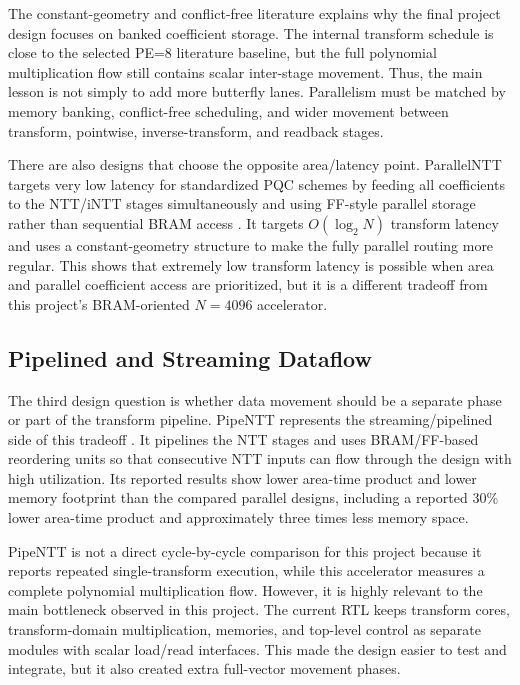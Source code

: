 \documentclass[a4paper, 12pt, titlepage]{article}
\begin{document}
The constant-geometry and conflict-free literature explains why the final
project design focuses on banked coefficient storage. The internal transform
schedule is close to the selected PE=8 literature baseline, but the full
polynomial multiplication flow still contains scalar inter-stage movement.
Thus, the main lesson is not simply to add more butterfly lanes. Parallelism
must be matched by memory banking, conflict-free scheduling, and wider movement
between transform, pointwise, inverse-transform, and readback stages.

There are also designs that choose the opposite area/latency point. ParallelNTT
targets very low latency for standardized PQC schemes by feeding all
coefficients to the NTT/iNTT stages simultaneously and using FF-style parallel
storage rather than sequential BRAM access \cite{parallelntt}. It targets
\(O(\log_2 N)\) transform latency and uses a constant-geometry structure to make
the fully parallel routing more regular. This shows that extremely low
transform latency is possible when area and parallel coefficient access are
prioritized, but it is a different tradeoff from this project's BRAM-oriented
\(N=4096\) accelerator.

\subsection{Pipelined and Streaming Dataflow}

The third design question is whether data movement should be a separate phase
or part of the transform pipeline. PipeNTT represents the streaming/pipelined
side of this tradeoff \cite{pipentt}. It pipelines the NTT stages and uses
BRAM/FF-based reordering units so that consecutive NTT inputs can flow through
the design with high utilization. Its reported results show lower area-time
product and lower memory footprint than the compared parallel designs,
including a reported 30\% lower area-time product and approximately three times
less memory space.

PipeNTT is not a direct cycle-by-cycle comparison for this project because it
reports repeated single-transform execution, while this accelerator measures a
complete polynomial multiplication flow. However, it is highly relevant to the
main bottleneck observed in this project. The current RTL keeps transform cores,
transform-domain multiplication, memories, and top-level control as separate
modules with scalar load/read interfaces. This made the design easier to test
and integrate, but it also created extra full-vector movement phases.
\end{document}
